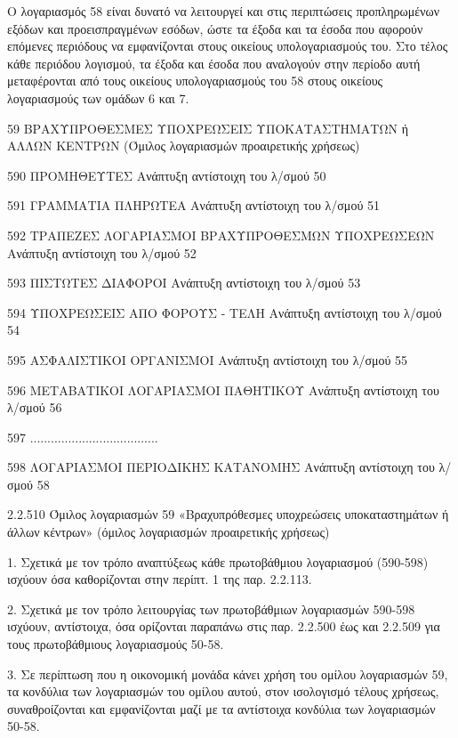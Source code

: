 \documentclass[A4,10pt,greek]{book}
\begin{document}
Ο λογαριασμός 58 είναι δυνατό να λειτουργεί και στις περιπτώσεις προπληρωμένων εξόδων και προεισπραγμένων εσόδων, ώστε τα έξοδα και τα έσοδα που αφορούν επόμενες περιόδους να εμφανίζονται στους οικείους υπολογαριασμούς του. Στο τέλος κάθε περιόδου λογισμού, τα έξοδα και έσοδα που αναλογούν στην περίοδο αυτή μεταφέρονται από τους οικείους υπολογαριασμούς του 58 στους οικείους λογαριασμούς των ομάδων 6 και 7.

 59   ΒΡΑΧΥΠΡΟΘΕΣΜΕΣ ΥΠΟΧΡΕΩΣΕΙΣ ΥΠΟΚΑΤΑΣΤΗΜΑΤΩΝ
        ή ΑΛΛΩΝ ΚΕΝΤΡΩΝ
        (Όμιλος λογαριασμών προαιρετικής χρήσεως)

        590   ΠΡΟΜΗΘΕΥΤΕΣ
                  Ανάπτυξη αντίστοιχη του λ/σμού 50

        591   ΓΡΑΜΜΑΤΙΑ ΠΛΗΡΩΤΕΑ
                  Ανάπτυξη αντίστοιχη του λ/σμού 51

        592   ΤΡΑΠΕΖΕΣ ΛΟΓΑΡΙΑΣΜΟΙ ΒΡΑΧΥΠΡΟΘΕΣΜΩΝ ΥΠΟΧΡΕΩΣΕΩΝ
                  Ανάπτυξη αντίστοιχη του λ/σμού 52

        593   ΠΙΣΤΩΤΕΣ ΔΙΑΦΟΡΟΙ
                  Ανάπτυξη αντίστοιχη του λ/σμού 53

        594   ΥΠΟΧΡΕΩΣΕΙΣ ΑΠΟ ΦΟΡΟΥΣ - ΤΕΛΗ
                  Ανάπτυξη αντίστοιχη του λ/σμού 54

        595   ΑΣΦΑΛΙΣΤΙΚΟΙ ΟΡΓΑΝΙΣΜΟΙ
                  Ανάπτυξη αντίστοιχη του λ/σμού 55

        596   ΜΕΤΑΒΑΤΙΚΟΙ ΛΟΓΑΡΙΑΣΜΟΙ ΠΑΘΗΤΙΚΟΥ
                  Ανάπτυξη αντίστοιχη του λ/σμού 56

        597   .....................................

        598   ΛΟΓΑΡΙΑΣΜΟΙ ΠΕΡΙΟΔΙΚΗΣ ΚΑΤΑΝΟΜΗΣ
                  Ανάπτυξη αντίστοιχη του λ/σμού 58

2.2.510 Όμιλος λογαριασμών 59 «Βραχυπρόθεσμες υποχρεώσεις υποκαταστημάτων ή άλλων κέντρων» (όμιλος λογαριασμών προαιρετικής χρήσεως)

1. Σχετικά με τον τρόπο αναπτύξεως κάθε πρωτοβάθμιου λογαριασμού (590-598) ισχύουν όσα καθορίζονται στην περίπτ. 1 της παρ. 2.2.113.

2. Σχετικά με τον τρόπο λειτουργίας των πρωτοβάθμιων λογαριασμών 590-598 ισχύουν, αντίστοιχα, όσα ορίζονται παραπάνω στις παρ. 2.2.500 έως και 2.2.509 για τους πρωτοβάθμιους λογαριασμούς 50-58.

3. Σε περίπτωση που η οικονομική μονάδα κάνει χρήση του ομίλου λογαριασμών 59, τα κονδύλια των λογαριασμών του ομίλου αυτού, στον ισολογισμό τέλους χρήσεως, συναθροίζονται και εμφανίζονται μαζί με τα αντίστοιχα κονδύλια των λογαριασμών 50-58.
\end{document}
